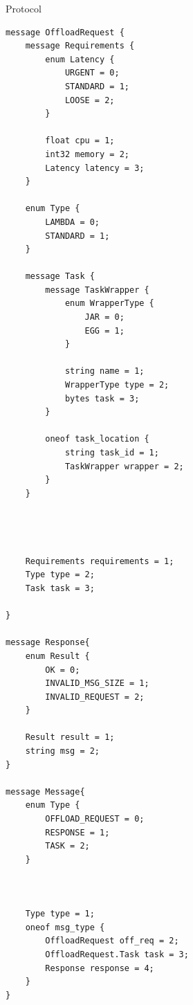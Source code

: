 \documentclass{beamer}
\begin{document}
\begin{frame}{Protocol}
\centering
\begin{lstlisting}
message OffloadRequest {
    message Requirements {
        enum Latency {
            URGENT = 0;
            STANDARD = 1;
            LOOSE = 2;
        }

        float cpu = 1;
        int32 memory = 2;
        Latency latency = 3;
    }
    
    enum Type {
        LAMBDA = 0;
        STANDARD = 1;
    }

    message Task {
        message TaskWrapper {
            enum WrapperType {
                JAR = 0;
                EGG = 1;
            }

            string name = 1;
            WrapperType type = 2;
            bytes task = 3;
        }

        oneof task_location {
            string task_id = 1;
            TaskWrapper wrapper = 2;
        }
    }




    Requirements requirements = 1;
    Type type = 2;
    Task task = 3;

}

message Response{
    enum Result {
        OK = 0;
        INVALID_MSG_SIZE = 1;
        INVALID_REQUEST = 2;
    }

    Result result = 1;
    string msg = 2;
}

message Message{
    enum Type {
        OFFLOAD_REQUEST = 0;
        RESPONSE = 1;
        TASK = 2;
    }
    
    

    Type type = 1;
    oneof msg_type {
        OffloadRequest off_req = 2;
        OffloadRequest.Task task = 3;
        Response response = 4;
    }
}

\end{lstlisting}
\end{frame}
\end{document}
